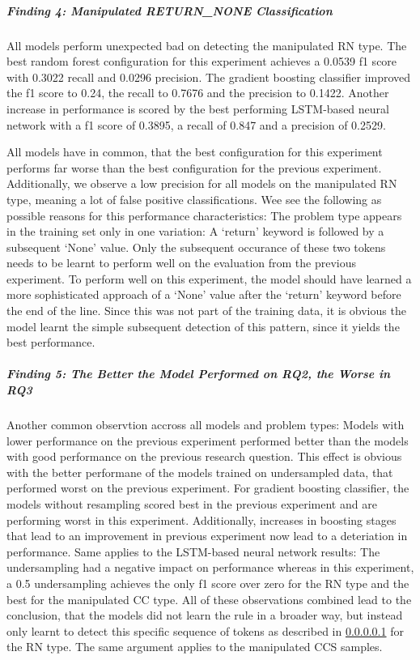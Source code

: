 \subparagraph{Finding 4: Manipulated RETURN\_NONE Classification}\label{finding:return_none_manipulated_bad}
All models perform unexpected bad on detecting the manipulated RN type. The best random forest configuration for this experiment achieves a 0.0539 f1 score with 0.3022 recall and 0.0296 precision. The gradient boosting classifier improved the f1 score to 0.24, the recall to 0.7676 and the precision to 0.1422. Another increase in performance is scored by the best performing LSTM-based neural network with a f1 score of 0.3895, a recall of 0.847 and a precision of 0.2529. 

All models have in common, that the best configuration for this experiment performs far worse than the best configuration for the previous experiment. Additionally, we observe a low precision for all models on the manipulated RN type, meaning a lot of false positive classifications.
Wee see the following as possible reasons for this performance characteristics:
The problem type appears in the training set only in one variation: A \enquote*{return} keyword is followed by a subsequent \enquote*{None} value. Only the subsequent occurance of these two tokens needs to be learnt to perform well on the evaluation from the previous experiment. To perform well on this experiment, the model should have learned a more sophisticated approach of a \enquote*{None} value after the \enquote*{return} keyword before the end of the line. Since this was not part of the training data, it is obvious the model learnt the simple subsequent detection of this pattern, since it yields the best performance. 


\subparagraph{Finding 5: The Better the Model Performed on RQ2, the Worse in RQ3} \label{finding:better_vs_worse}
Another common observtion accross all models and problem types: Models with lower performance on the previous experiment performed better than the models with good performance on the previous research question. 
This effect is obvious with the better performane of the models trained on undersampled data, that performed worst on the previous experiment. For gradient boosting classifier, the models without resampling scored best in the previous experiment and are performing worst in this experiment. Additionally, increases in boosting stages that lead to an improvement in previous experiment now lead to a deteriation in performance. Same applies to the LSTM-based neural network results: The undersampling had a negative impact on performance whereas in this experiment, a 0.5 undersampling achieves the only f1 score over zero for the RN type and the best for the manipulated CC type.
All of these observations combined lead to the conclusion, that the models did not learn the rule in a broader way, but instead only learnt to detect this specific sequence of tokens as described in \ref{finding:return_none_manipulated_bad} for the RN type. The same argument applies to the manipulated CCS samples.

